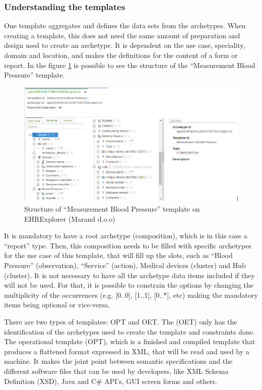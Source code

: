 \documentclass[mim_thesis.tex]{subfiles}
\begin{document}
\subsubsection{Understanding the templates}
One template aggregates and defines the data sets from the archetypes. When creating a template, this does not need the same amount of preparation and design used to create an archetype. It is dependent on the use case, speciality, domain and location, and makes the definitions for the content of a form or report. In the figure \ref{fig:bp_arch_struct} is possible to see the structure of the “Measurement Blood Pressure” template.

\begin{figure}[H]
	\centering
    \includegraphics[width=1\textwidth]{img/bp_arch_struct.PNG}
	\caption{Structure of “Measurement Blood Pressure” template on EHRExplorer (Marand d.o.o) }
	\label{fig:bp_arch_struct}
\end{figure}

It is mandatory to have a root archetype (composition), which is in this case a “report” type. Then, this composition needs to be filled with specific archetypes for the use case of this template, that will fill up the slots, such as “Blood Pressure” (observation), “Service” (action),  Medical devices (cluster) and Hub (cluster). It is not necessary to have all the archetype data items included if they will not be used. For that, it is possible to constrain the options by changing the multiplicity of the occurrences (e.g. [0..0], [1..1], [0..*], etc) making the mandatory items being optional or vice-versa. \citep{Beale2007}

There are two types of templates: \ac{OPT} and \ac{OET}. The (OET) only has the identification of the archetypes used to create the template and constraints done. The operational template (OPT), which is a finished and compiled template that produces a flattened format expressed in XML, that will be read and used by a machine. It makes the joint point between semantic specifications and the different software files that can be used by developers, like XML Schema Definition (XSD), Java and C\# API’s, GUI screen forms and others.
\end{document}
